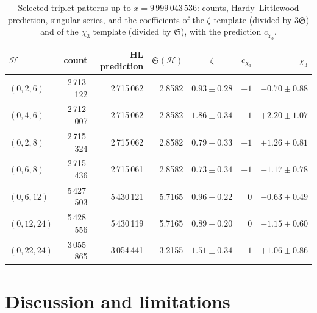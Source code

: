 \documentclass[11pt]{amsart}
\theoremstyle{remark}
\newcommand{\Sing}{\mathfrak{S}}
\newcommand{\cH}{\mathcal{H}}
\begin{document}
\begin{table}[t]
\centering\small
\caption{Selected triplet patterns up to $x=9\,999\,043\,536$: counts, Hardy--Littlewood prediction, singular series, and the coefficients of the $\zeta$ template (divided by $3\Sing$) and of the $\chi_3$ template (divided by $\Sing$), with the prediction $c_{\chi_3}$.}
\label{tab:triplets}
\begin{tabular}{lrrrcrr}
\toprule
$\cH$ & count & HL prediction & $\Sing(\cH)$ & $\zeta$ & $c_{\chi_3}$ & $\chi_3$\\
\midrule
$(0,2,6)$ & 2\,713\,122 & 2\,715\,062 & 2.8582 & $0.93\pm0.28$ & $-1$ & $-0.70\pm0.88$\\
$(0,4,6)$ & 2\,712\,007 & 2\,715\,062 & 2.8582 & $1.86\pm0.34$ & $+1$ & $+2.20\pm1.07$\\
$(0,2,8)$ & 2\,715\,324 & 2\,715\,062 & 2.8582 & $0.79\pm0.33$ & $+1$ & $+1.26\pm0.81$\\
$(0,6,8)$ & 2\,715\,436 & 2\,715\,061 & 2.8582 & $0.73\pm0.34$ & $-1$ & $-1.17\pm0.78$\\
$(0,6,12)$ & 5\,427\,503 & 5\,430\,121 & 5.7165 & $0.96\pm0.22$ & $0$ & $-0.63\pm0.49$\\
$(0,12,24)$ & 5\,428\,556 & 5\,430\,119 & 5.7165 & $0.89\pm0.20$ & $0$ & $-1.15\pm0.60$\\
$(0,22,24)$ & 3\,055\,865 & 3\,054\,441 & 3.2155 & $1.51\pm0.34$ & $+1$ & $+1.06\pm0.86$\\
\bottomrule
\end{tabular}
\end{table}

\section{Discussion and limitations}
\end{document}

